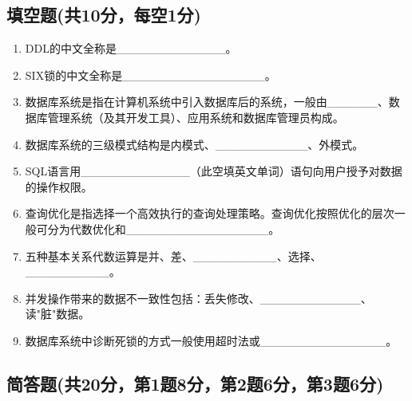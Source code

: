 \documentclass{article}
\begin{document}
\subsection{填空题(共10分，每空1分)}

\begin{enumerate}
\item DDL的中文全称是\_\_\_\_\_\_\_\_\_\_\_\_\_。

\item SIX锁的中文全称是\_\_\_\_\_\_\_\_\_\_\_\_\_\_\_\_\_。

\item 数据库系统是指在计算机系统中引入数据库后的系统，一般由\_\_\_\_\_\_、数据库管理系统（及其开发工具）、应用系统和数据库管理员构成。

\item 数据库系统的三级模式结构是内模式、\_\_\_\_\_\_\_\_\_\_\_、外模式。

\item SQL语言用\_\_\_\_\_\_\_\_\_\_\_\_\_（此空填英文单词）语句向用户授予对数据的操作权限。

\item 查询优化是指选择一个高效执行的查询处理策略。查询优化按照优化的层次一般可分为代数优化和\_\_\_\_\_\_\_\_\_\_\_\_\_\_\_\_\_。

\item 五种基本关系代数运算是并、差、\_\_\_\_\_\_\_\_\_\_、选择、\_\_\_\_\_\_\_\_\_\_。

\item 并发操作带来的数据不一致性包括：丢失修改、\_\_\_\_\_\_\_\_\_\_\_\_、读"脏"数据。

\item 数据库系统中诊断死锁的方式一般使用超时法或\_\_\_\_\_\_\_\_\_\_\_\_\_\_\_。
\end{enumerate}

\subsection{简答题(共20分，第1题8分，第2题6分，第3题6分)}
\end{document}
